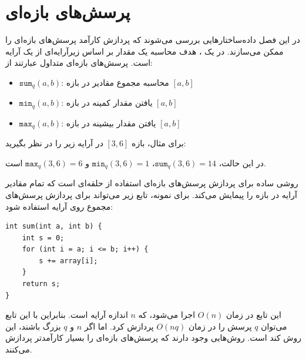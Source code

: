 \chapter{پرسش‌های بازه‌ای}


در این فصل داده‌ساختارهایی بررسی می‌شوند
که پردازش کارآمد پرسش‌های بازه‌ای را ممکن می‌سازند.
در یک ،
هدف محاسبه یک مقدار
بر اساس زیرآرایه‌ای از یک آرایه است.
پرسش‌های بازه‌ای متداول عبارتند از:
\begin{itemize}
\item $\texttt{sum}_q(a,b)$: محاسبه مجموع مقادیر در بازه $[a,b]$
\item $\texttt{min}_q(a,b)$: یافتن مقدار کمینه در بازه $[a,b]$
\item $\texttt{max}_q(a,b)$: یافتن مقدار بیشینه در بازه $[a,b]$
\end{itemize}

برای مثال، بازه $[3,6]$ در آرایه زیر را در نظر بگیرید:
\begin{center}
\end{center}
در این حالت، $\texttt{sum}_q(3,6)=14$،
$\texttt{min}_q(3,6)=1$ و $\texttt{max}_q(3,6)=6$ است.

روشی ساده برای پردازش پرسش‌های بازه‌ای استفاده از
حلقه‌ای است که تمام مقادیر آرایه در بازه را پیمایش می‌کند.
برای نمونه، تابع زیر می‌تواند
برای پردازش پرسش‌های مجموع روی آرایه استفاده شود:

\begin{lstlisting}
int sum(int a, int b) {
    int s = 0;
    for (int i = a; i <= b; i++) {
        s += array[i];
    }
    return s;
}
\end{lstlisting}

این تابع در زمان $O(n)$ اجرا می‌شود،
که $n$ اندازه آرایه است.
بنابراین با این تابع می‌توان $q$ پرسش را در زمان $O(nq)$
پردازش کرد.
اما اگر $n$ و $q$ بزرگ باشند، این روش
کند است. روش‌هایی وجود دارند که
پرسش‌های بازه‌ای را بسیار کارآمدتر پردازش می‌کنند.

